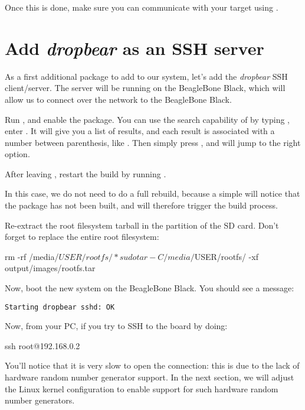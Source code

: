 Once this is done, make sure you can communicate with your target
using .

\section{Add {\em dropbear} as an SSH server}

As a first additional package to add to our system, let's add the {\em
dropbear} SSH client/server. The server will be running on the
BeagleBone Black, which will allow us to connect over the network to
the BeagleBone Black.

Run , and enable the 
package. You can use the search capability of  by
typing \code{/}, enter . It will give you a list of
results, and each result is associated with a number between
parenthesis, like . Then simply press , and
 will jump to the right option.

After leaving , restart the build by running
.

In this case, we do not need to do a full rebuild, because a simple
 will notice that the  package has not been
built, and will therefore trigger the build process.

Re-extract the root filesystem tarball in the  partition
of the SD card. Don't forget to replace the entire root filesystem:

\begin{bashinput}
rm -rf /media/$USER/rootfs/*
sudo tar -C /media/$USER/rootfs/ -xf output/images/rootfs.tar
\end{bashinput}

Now, boot the new system on the BeagleBone Black. You should see a
message:

\begin{verbatim}
Starting dropbear sshd: OK
\end{verbatim}

Now, from your PC, if you try to SSH to the board by doing:

\begin{bashinput}
ssh root@192.168.0.2
\end{bashinput}

You'll notice that it is very slow to open the connection: this is due
to the lack of hardware random number generator support. In the next
section, we will adjust the Linux kernel configuration to enable
support for such hardware random number generators.

